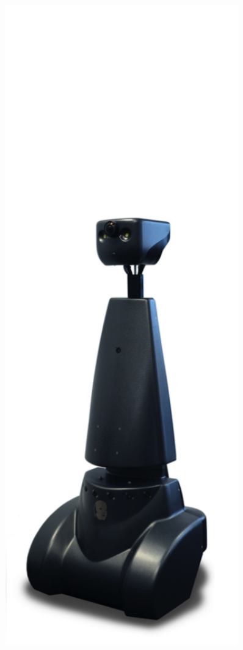 \begin{figure}[ht]
\begin{minipage}[b]{.25\linewidth}
      \label{fig:z} 
   \end{minipage}%
   \hfill
   \begin{minipage}[b]{.25\linewidth} 
      \centering 
      \includegraphics[width=0.9\textwidth]{bilder/grundlagen/3.png} 

\end{minipage}
\end{figure}
